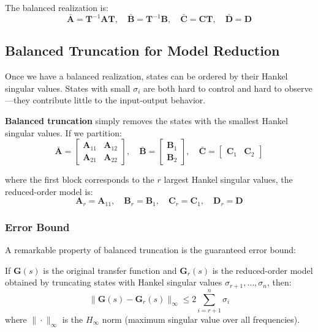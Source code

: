 The balanced realization is:
\begin{equation}
\bar{\mathbf{A}} = \mathbf{T}^{-1}\mathbf{A}\mathbf{T}, \quad \bar{\mathbf{B}} = \mathbf{T}^{-1}\mathbf{B}, \quad \bar{\mathbf{C}} = \mathbf{C}\mathbf{T}, \quad \bar{\mathbf{D}} = \mathbf{D}
\end{equation}

\subsection{Balanced Truncation for Model Reduction}

Once we have a balanced realization, states can be ordered by their Hankel singular values. States with small $\sigma_i$ are both hard to control and hard to observe---they contribute little to the input-output behavior.

\textbf{Balanced truncation} simply removes the states with the smallest Hankel singular values. If we partition:
\begin{equation}
\bar{\mathbf{A}} = \begin{bmatrix} \mathbf{A}_{11} & \mathbf{A}_{12} \\ \mathbf{A}_{21} & \mathbf{A}_{22} \end{bmatrix}, \quad
\bar{\mathbf{B}} = \begin{bmatrix} \mathbf{B}_1 \\ \mathbf{B}_2 \end{bmatrix}, \quad
\bar{\mathbf{C}} = \begin{bmatrix} \mathbf{C}_1 & \mathbf{C}_2 \end{bmatrix}
\end{equation}

where the first block corresponds to the $r$ largest Hankel singular values, the reduced-order model is:
\begin{equation}
\mathbf{A}_r = \mathbf{A}_{11}, \quad \mathbf{B}_r = \mathbf{B}_1, \quad \mathbf{C}_r = \mathbf{C}_1, \quad \mathbf{D}_r = \mathbf{D}
\end{equation}

\subsubsection{Error Bound}

A remarkable property of balanced truncation is the guaranteed error bound:

\begin{theorem}
If $\mathbf{G}(s)$ is the original transfer function and $\mathbf{G}_r(s)$ is the reduced-order model obtained by truncating states with Hankel singular values $\sigma_{r+1}, \ldots, \sigma_n$, then:
\begin{equation}
\|\mathbf{G}(s) - \mathbf{G}_r(s)\|_\infty \leq 2\sum_{i=r+1}^{n} \sigma_i
\end{equation}
where $\|\cdot\|_\infty$ is the $H_\infty$ norm (maximum singular value over all frequencies).
\end{theorem}

